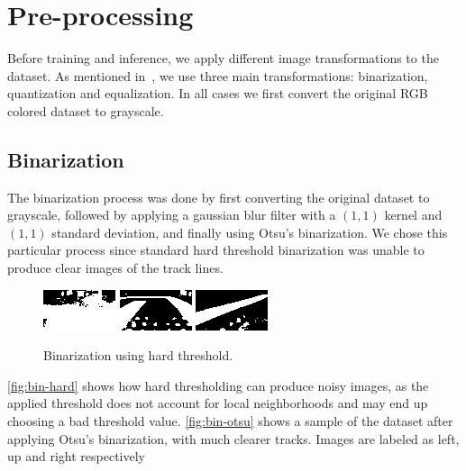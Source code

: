 
\chapter{Pre-processing}\label{chp:preprocessing}

Before training and inference, we apply different image transformations to the dataset. As
mentioned in~, we use three main transformations: binarization, quantization
and equalization. In all cases we first convert the original RGB colored dataset to grayscale.

\section{Binarization}

The binarization process was done by first converting the original dataset to grayscale, followed
by applying a gaussian blur filter with a $(1, 1)$ kernel and $(1, 1)$ standard deviation, and
finally using Otsu's binarization. We chose this particular process since standard hard threshold
binarization was unable to produce clear images of the track lines.

\begin{figure}[h]
  \centering
  \includegraphics[scale=1.75]{imgs/binary_left_h.png}
  \includegraphics[scale=1.75]{imgs/binary_up_h.png}
  \includegraphics[scale=1.75]{imgs/binary_right_h.png}
  \caption{Binarization using hard threshold.\label{fig:bin-hard}}
\end{figure}

\autoref{fig:bin-hard} shows how hard thresholding can produce noisy images, as the applied
threshold does not account for local neighborhoods and may end up choosing a bad threshold value.
\autoref{fig:bin-otsu} shows a sample of the dataset after applying Otsu's binarization, with much
clearer tracks. Images are labeled as left, up and right respectively

